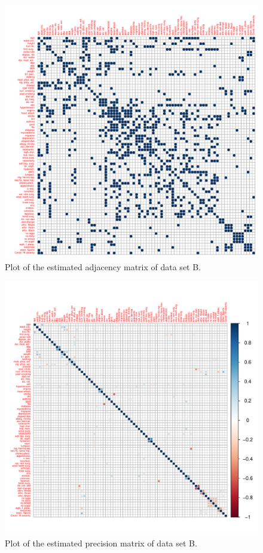 \begin{figure}[ht]
    \centering
    \includegraphics[width=1.0\textwidth]{Figures/corrplot_admat_B.pdf}
    \caption{Plot of the estimated adjacency matrix of data set B.}
    \label{fig:corrplot_admat_B}
\end{figure}

\begin{figure}
    \centering
    \includegraphics[width=1.0\textwidth]{Figures/corrplot_omega_B.pdf}
    \caption{Plot of the estimated precision matrix of data set B.}
    \label{fig:corrplot_omega_B}
\end{figure}


